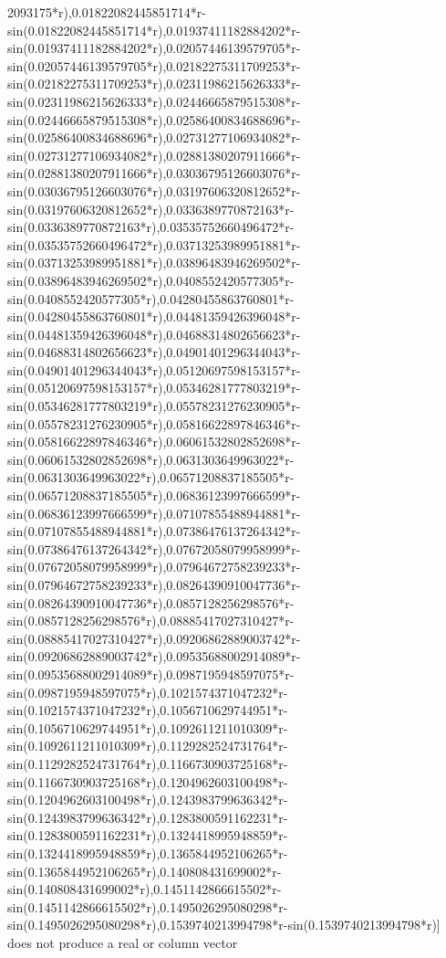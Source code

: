 \documentclass[a4paper,10pt]{article}
\begin{document}
\begin{eulernotebook}
\begin{eulercomment}
\begin{eulercomment}
\begin{eulercomment}
\begin{eulercomment}
\begin{euleroutput}
2093175*r),0.01822082445851714*r-sin(0.01822082445851714*r),0.01937411182884202*r-sin(0.01937411182884202*r),0.02057446139579705*r-sin(0.02057446139579705*r),0.02182275311709253*r-sin(0.02182275311709253*r),0.02311986215626333*r-sin(0.02311986215626333*r),0.02446665879515308*r-sin(0.02446665879515308*r),0.02586400834688696*r-sin(0.02586400834688696*r),0.02731277106934082*r-sin(0.02731277106934082*r),0.02881380207911666*r-sin(0.02881380207911666*r),0.03036795126603076*r-sin(0.03036795126603076*r),0.03197606320812652*r-sin(0.03197606320812652*r),0.0336389770872163*r-sin(0.0336389770872163*r),0.03535752660496472*r-sin(0.03535752660496472*r),0.03713253989951881*r-sin(0.03713253989951881*r),0.03896483946269502*r-sin(0.03896483946269502*r),0.0408552420577305*r-sin(0.0408552420577305*r),0.04280455863760801*r-sin(0.04280455863760801*r),0.04481359426396048*r-sin(0.04481359426396048*r),0.04688314802656623*r-sin(0.04688314802656623*r),0.04901401296344043*r-sin(0.04901401296344043*r),0.05120697598153157*r-sin(0.05120697598153157*r),0.05346281777803219*r-sin(0.05346281777803219*r),0.05578231276230905*r-sin(0.05578231276230905*r),0.05816622897846346*r-sin(0.05816622897846346*r),0.06061532802852698*r-sin(0.06061532802852698*r),0.0631303649963022*r-sin(0.0631303649963022*r),0.06571208837185505*r-sin(0.06571208837185505*r),0.06836123997666599*r-sin(0.06836123997666599*r),0.07107855488944881*r-sin(0.07107855488944881*r),0.07386476137264342*r-sin(0.07386476137264342*r),0.07672058079958999*r-sin(0.07672058079958999*r),0.07964672758239233*r-sin(0.07964672758239233*r),0.08264390910047736*r-sin(0.08264390910047736*r),0.0857128256298576*r-sin(0.0857128256298576*r),0.08885417027310427*r-sin(0.08885417027310427*r),0.09206862889003742*r-sin(0.09206862889003742*r),0.09535688002914089*r-sin(0.09535688002914089*r),0.0987195948597075*r-sin(0.0987195948597075*r),0.1021574371047232*r-sin(0.1021574371047232*r),0.1056710629744951*r-sin(0.1056710629744951*r),0.1092611211010309*r-sin(0.1092611211010309*r),0.1129282524731764*r-sin(0.1129282524731764*r),0.1166730903725168*r-sin(0.1166730903725168*r),0.1204962603100498*r-sin(0.1204962603100498*r),0.1243983799636342*r-sin(0.1243983799636342*r),0.1283800591162231*r-sin(0.1283800591162231*r),0.1324418995948859*r-sin(0.1324418995948859*r),0.1365844952106265*r-sin(0.1365844952106265*r),0.140808431699002*r-sin(0.140808431699002*r),0.1451142866615502*r-sin(0.1451142866615502*r),0.1495026295080298*r-sin(0.1495026295080298*r),0.1539740213994798*r-sin(0.1539740213994798*r)] does not produce a real or column vector
  

\end{euleroutput}
\end{eulercomment}
\end{eulercomment}
\end{eulercomment}
\end{eulercomment}
\end{eulernotebook}
\end{document}

